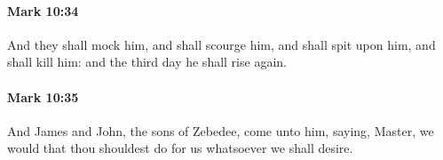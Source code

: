 		\paragraph{Mark 10:34} %
			\label{MARK-10-34}

			And they shall mock him, and shall scourge him, and shall spit upon him, and shall kill him: and the third day he shall rise again.
			
			\begin{framed}
			\scriptsize
				\begin{compactdesc}
					\item[SBLG] 
				\end{compactdesc}
			\end{framed}

		\paragraph{Mark 10:35} %
			\label{MARK-10-35}

			And James and John, the sons of Zebedee, come unto him, saying, Master, we would that thou shouldest do for us whatsoever we shall desire.

